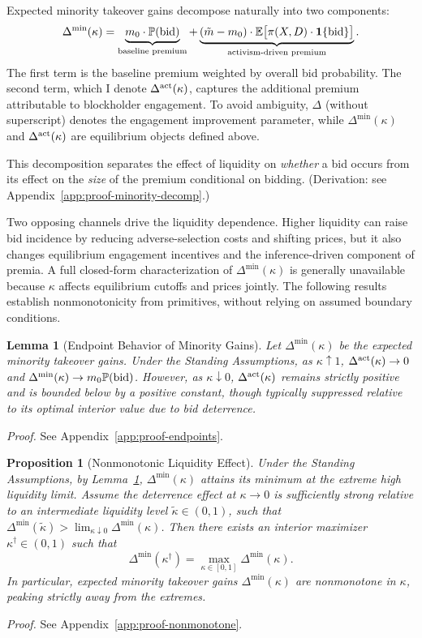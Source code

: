 \documentclass[11pt]{article}
\newtheorem{proposition}{Proposition}
\newtheorem{lemma}{Lemma}
\newcommand{\E}{\mathbb{E}}
\newcommand{\PP}{\mathbb{P}}
\newcommand{\1}{\mathbf{1}}
\begin{document}
Expected minority takeover gains decompose naturally into two components:
\begin{equation}
\Delta^{\min}(\kappa) = \underbrace{m_0 \cdot \PP(\textup{bid})}_{\text{baseline premium}} + \underbrace{(\tilde{m}-m_0)\cdot \E\big[\pi(X,D)\cdot \1\{\textup{bid}\}\big]}_{\text{activism-driven premium}}.
\label{eq:decomp}
\end{equation}
The first term is the baseline premium weighted by overall bid probability. The second term, which I denote $\Delta^{\textup{act}}(\kappa)$, captures the additional premium attributable to blockholder engagement. To avoid ambiguity, $\Delta$ (without superscript) denotes the engagement improvement parameter, while $\Delta^{\min}(\kappa)$ and $\Delta^{\textup{act}}(\kappa)$ are equilibrium objects defined above.

This decomposition separates the effect of liquidity on \emph{whether} a bid occurs from its effect on the \emph{size} of the premium conditional on bidding. (Derivation: see Appendix~\ref{app:proof-minority-decomp}.)

Two opposing channels drive the liquidity dependence. Higher liquidity can raise bid incidence by reducing adverse-selection costs and shifting prices, but it also changes equilibrium engagement incentives and the inference-driven component of premia. A full closed-form characterization of $\Delta^{\min}(\kappa)$ is generally unavailable because $\kappa$ affects equilibrium cutoffs and prices jointly. The following results establish nonmonotonicity from primitives, without relying on assumed boundary conditions.

\begin{lemma}[Endpoint Behavior of Minority Gains]
\label{lem:endpoints}
Let $\Delta^{\min}(\kappa)$ be the expected minority takeover gains. Under the Standing Assumptions, as $\kappa\uparrow 1$, $\Delta^{\textup{act}}(\kappa)\to 0$ and $\Delta^{\min}(\kappa)\to m_0\PP(\textup{bid})$. However, as $\kappa\downarrow 0$, $\Delta^{\textup{act}}(\kappa)$ remains strictly positive and is bounded below by a positive constant, though typically suppressed relative to its optimal interior value due to bid deterrence.
\end{lemma}
\textit{Proof.} See Appendix~\ref{app:proof-endpoints}.

\begin{proposition}[Nonmonotonic Liquidity Effect]
\label{prop:nonmonotone}
Under the Standing Assumptions, by Lemma~\ref{lem:endpoints}, $\Delta^{\min}(\kappa)$ attains its minimum at the extreme high liquidity limit. Assume the deterrence effect at $\kappa \to 0$ is sufficiently strong relative to an intermediate liquidity level $\tilde{\kappa}\in(0,1)$, such that $\Delta^{\min}(\tilde{\kappa}) > \lim_{\kappa \downarrow 0} \Delta^{\min}(\kappa)$. Then there exists an interior maximizer $\kappa^{\dagger}\in(0,1)$ such that
\[
\Delta^{\min}(\kappa^{\dagger})=\max_{\kappa\in[0,1]}\Delta^{\min}(\kappa).
\]
In particular, expected minority takeover gains $\Delta^{\min}(\kappa)$ are nonmonotone in $\kappa$, peaking strictly away from the extremes.
\end{proposition}
\textit{Proof.} See Appendix~\ref{app:proof-nonmonotone}.
\end{document}
